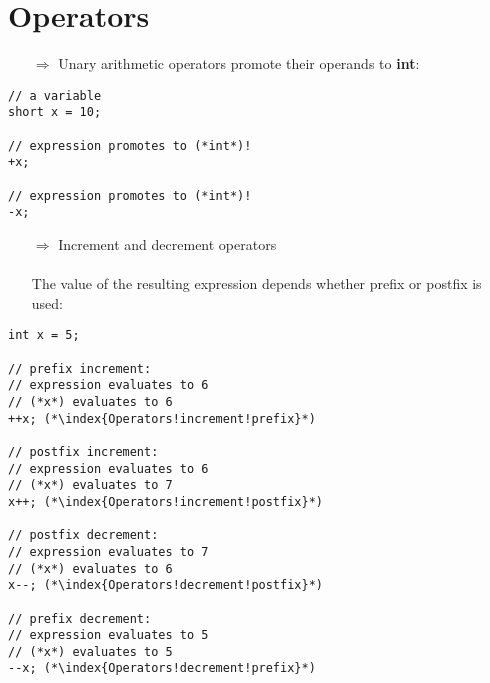 \documentclass[10pt]{book}
\begin{document}
\section{Operators}
\begin{enumerate}
\item[$\Rightarrow$] Unary arithmetic operators promote their operands to \textbf{int}:
\end{enumerate}
\begin{lstlisting}
// a variable
short x = 10;

// expression promotes to (*int*)!
+x;

// expression promotes to (*int*)!
-x;
\end{lstlisting}
\begin{enumerate}
\item[$\Rightarrow$] Increment and decrement operators\\ \\ The value of the resulting expression depends whether prefix or postfix is used:
\end{enumerate}
\begin{lstlisting}
int x = 5;

// prefix increment:
// expression evaluates to 6
// (*x*) evaluates to 6
++x; (*\index{Operators!increment!prefix}*)

// postfix increment:
// expression evaluates to 6
// (*x*) evaluates to 7
x++; (*\index{Operators!increment!postfix}*)

// postfix decrement:
// expression evaluates to 7
// (*x*) evaluates to 6
x--; (*\index{Operators!decrement!postfix}*)

// prefix decrement:
// expression evaluates to 5
// (*x*) evaluates to 5
--x; (*\index{Operators!decrement!prefix}*)
\end{lstlisting}
%
%
\end{document}
